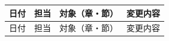 %
%
%

\begin{longtable}{p{2.2cm}p{3.5cm}p{4cm}p{5.5cm}}
\toprule
日付 & 担当 & 対象（章・節） & 変更内容 \\
\midrule
\endfirsthead

\toprule
日付 & 担当 & 対象（章・節） & 変更内容 \\
\midrule
\endhead


\end{longtable}
